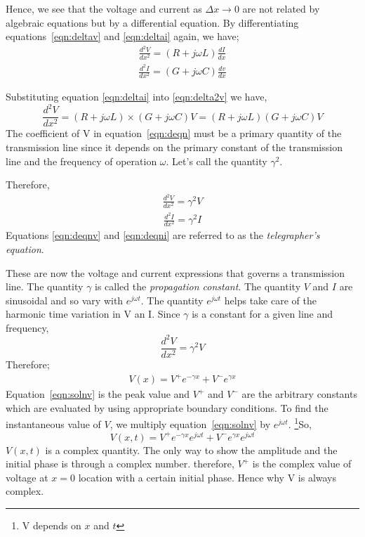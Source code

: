 Hence, we see that the voltage and current as $\Delta x \rightarrow 0$ are not related by algebraic equations but by a differential equation. By differentiating equations~\eqref{eqn:deltav} and \eqref{eqn:deltai} again, we have; 
\begin{align}
\frac{d^{2}V}{dx^{2}} =  (R + j\omega L)\frac{dI}{dx} 
\label{eqn:delta2v}
\end{align}
\begin{align}
\frac{d^{2}I}{dx^{2}} =  (G + j\omega C)\frac{dv}{dx}
\label{eqn:delta2i}
\end{align}

Substituting equation \eqref{eqn:deltai} into \eqref{eqn:delta2v} we have,
\begin{dmath}
\frac{d^{2}V}{dx^{2}} =  (R + j\omega L)\times (G + j\omega C)V = (R + j\omega L)(G + j\omega C)V 
\label{eqn:deqn}
\end{dmath}   
The coefficient of V in equation~\ref{eqn:deqn} must be a primary quantity of the transmission line since it depends on the primary constant of the transmission line and the frequency of operation $ \omega$. Let's call the quantity $ \gamma^{2}$.

Therefore, 
\begin{align}
\frac{d^{2}V}{dx^{2}} = \gamma^{2}V 
\label{eqn:deqnv}
\end{align}
\begin{align}
\frac{d^{2}I}{dx^{2}} = \gamma^{2}I 
\label{eqn:deqni}
\end{align}
Equations \ref{eqn:deqnv} and \ref{eqn:deqni} are referred to as the \emph{telegrapher's equation}.

These are now the voltage and current expressions that governs a transmission line. The quantity $ \gamma $ is called the \emph{propagation constant}. The quantity $V$ and $I$ are sinusoidal and so vary with $e^{j\omega t}$. The quantity $e^{j\omega t}$ helps take care of the harmonic time variation in V an I. 
Since $\gamma$ is a constant for a given line and frequency, 
\[\frac{d^{2}V}{dx^{2}} = \gamma^{2}V\]
Therefore; 
\begin{align}
V(x) = V^{+} e ^{- \gamma x} + V^{-}e^{\gamma x}  
\label{eqn:solnv}
\end{align}
Equation~\eqref{eqn:solnv} is the peak value and $V^+$ and $V^-$ are the arbitrary constants which are evaluated by using appropriate boundary conditions. To find the instantaneous value of $V$, we multiply equation~\eqref{eqn:solnv} by $e^{j\omega t}$. \footnote{V depends on $x$ and $t$}So,
\begin{dmath}
V(x,t) = V^{+} e^{-\gamma x}e^{j\omega t} + V^{-} e^{\gamma x}e^{j\omega t}
\label{eqn:solnv2}
\end{dmath}
$V(x,t)$ is a complex quantity. The only way to show the amplitude and the initial phase is through a complex number. therefore, $ V^{+}$ is the complex value of voltage at $x=0$ location with a certain initial phase. Hence why V is always complex. 

